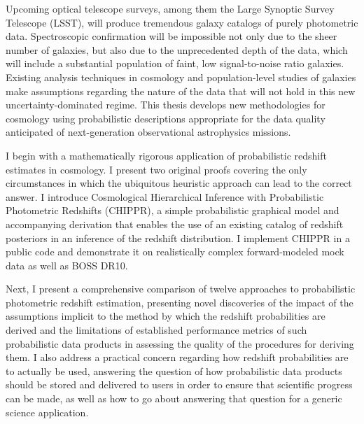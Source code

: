 Upcoming optical telescope surveys, among them the Large Synoptic Survey Telescope (LSST), will produce tremendous galaxy catalogs of purely photometric data.
Spectroscopic confirmation will be impossible not only due to the sheer number of galaxies, but also due to the unprecedented depth of the data, which will include a substantial population of faint, low signal-to-noise ratio galaxies.
Existing analysis techniques in cosmology and population-level studies of galaxies make assumptions regarding the nature of the data that will not hold in this new uncertainty-dominated regime.
This thesis develops new methodologies for cosmology using probabilistic descriptions appropriate for the data quality anticipated of next-generation observational astrophysics missions. 

I begin with a mathematically rigorous application of probabilistic redshift estimates in cosmology.
I present two original proofs covering the only circumstances in which the ubiquitous heuristic approach can lead to the correct answer.
I introduce Cosmological Hierarchical Inference with Probabilistic Photometric Redshifts (CHIPPR), a simple probabilistic graphical model and accompanying derivation that enables the use of an existing catalog of redshift posteriors in an inference of the redshift distribution.
I implement CHIPPR in a public code and demonstrate it on realistically complex forward-modeled mock data as well as BOSS DR10.

Next, I present a comprehensive comparison of twelve approaches to probabilistic photometric redshift estimation, presenting novel discoveries of the impact of the assumptions implicit to the method by which the redshift probabilities are derived and the limitations of established performance metrics of such probabilistic data products in assessing the quality of the procedures for deriving them.
I also address a practical concern regarding how redshift probabilities are to actually be used, answering the question of how probabilistic data products should be stored and delivered to users in order to ensure that scientific progress can be made, as well as how to go about answering that question for a generic science application.

